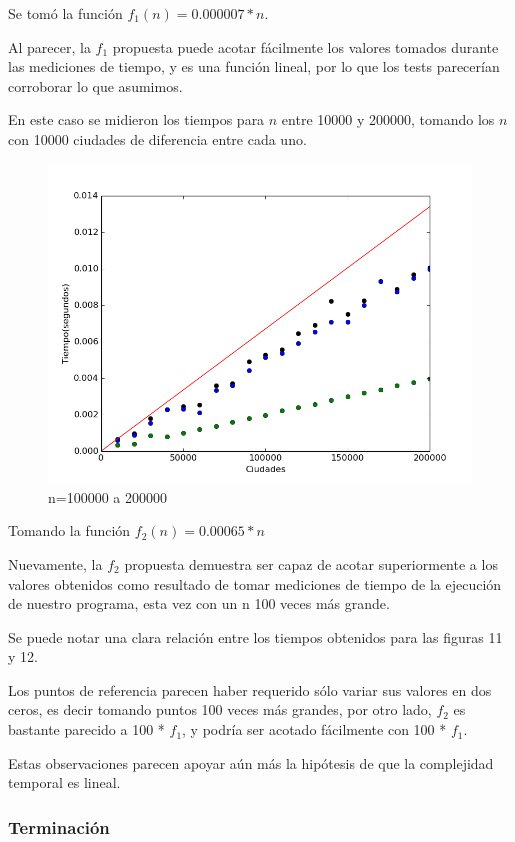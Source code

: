 \documentclass[spanish,a4paper]{article}
\begin{document}
Se tomó la función $f_1(n)=0.000007*n$.

Al parecer, la $f_1$ propuesta puede acotar fácilmente los valores tomados durante las mediciones de tiempo, y es una función lineal, por lo que los tests parecerían corroborar lo que asumimos.

En este caso se midieron los tiempos para $n$ entre 10000 y 200000, tomando los $n$ con 10000 ciudades de diferencia entre cada uno.

\begin{figure}[H]
\centering
\includegraphics[width=450pt]{ej1_10000a200000.png}
\caption{n=100000 a 200000}
\end{figure}

Tomando la función $f_2(n)=0.00065*n$

Nuevamente, la $f_2$ propuesta demuestra ser capaz de acotar superiormente a los valores obtenidos como resultado de tomar mediciones de tiempo de la ejecución de nuestro programa, esta vez con un n 100 veces más grande.

Se puede notar una clara relación entre los tiempos obtenidos para las figuras 11 y 12.

Los puntos de referencia parecen haber requerido sólo variar sus valores en dos ceros, es decir tomando puntos 100 veces más grandes, por otro lado, $f_2$ es bastante parecido a 100 * $f_1$, y podría ser acotado fácilmente con 100 * $f_1$.

Estas observaciones parecen apoyar aún más la hipótesis de que la complejidad temporal es lineal.

\subsubsection{Terminación}
\end{document}

